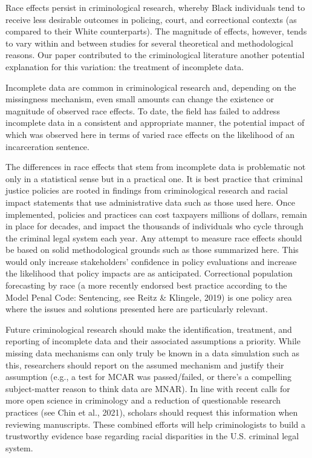 \documentclass[titlepage]{article}
\begin{document}
Race effects persist in criminological research, whereby Black individuals tend to receive less desirable outcomes in policing, court, and correctional contexts (as compared to their White counterparts). The magnitude of effects, however, tends to vary within and between studies for several theoretical and methodological reasons. Our paper contributed to the criminological literature another potential explanation for this variation: the treatment of incomplete data.

Incomplete data are common in criminological research and, depending on the missingness mechanism, even small amounts can change the existence or magnitude of observed race effects. To date, the field has failed to address incomplete data in a consistent and appropriate manner, the potential impact of which was observed here in terms of varied race effects on the likelihood of an incarceration sentence.

The differences in race effects that stem from incomplete data is problematic not only in a statistical sense but in a practical one. It is best practice that criminal justice policies are rooted in findings from criminological research and racial impact statements that use administrative data such as those used here. Once implemented, policies and practices can cost taxpayers millions of dollars, remain in place for decades, and impact the thousands of individuals who cycle through the criminal legal system each year. Any attempt to measure race effects should be based on solid methodological grounds such as those summarized here. This would only increase stakeholders’ confidence in policy evaluations and increase the likelihood that policy impacts are as anticipated. Correctional population forecasting by race (a more recently endorsed best practice according to the Model Penal Code: Sentencing, see Reitz \& Klingele, 2019) is one policy area where the issues and solutions presented here are particularly relevant.

Future criminological research should make the identification, treatment, and reporting of incomplete data and their associated assumptions a priority. While missing data mechanisms can only truly be known in a data simulation such as this, researchers should report on the assumed mechanism and justify their assumption (e.g., a test for MCAR was passed/failed, or there's a compelling subject-matter reason to think data are MNAR). In line with recent calls for more open science in criminology and a reduction of questionable research practices (see Chin et al., 2021), scholars should request this information when reviewing manuscripts. These combined efforts will help criminologists to build a trustworthy evidence base regarding racial disparities in the U.S. criminal legal system.
\end{document}
